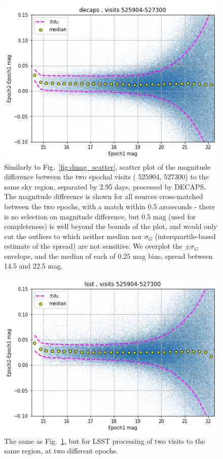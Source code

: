 \documentclass[DM,lsstdraft,toc,usenatbib]{lsstdoc}
\begin{document}
\begin{figure}
\begin{centering}
\includegraphics[width=0.7\columnwidth]{figs/18_decaps-decaps525904-527300_dmag.png}
\caption{Similarly to Fig.~\ref{fig:dmag_scatter}, scatter plot of the magnitude difference between the two epochal visits ( 525904, 527300) to the same sky region, separated by 2.95 days, processed by DECAPS. The magnitude difference is shown for all sources cross-matched between  the two epochs, with a match within 0.5 arcseconds - there is no selection on magnitude difference, but 0.5 mag (used for completeness) is well beyond the bounds of the plot, and would only cut the outliers to which neither median nor $\sigma_{G}$ (interquartile-based estimate of the spread) are not sensitive.  We overplot the $\pm \sigma_{G}$ envelope, and the median of each of 0.25 mag bins, spread between 14.5 and 22.5 mag. }
\label{fig:epoch-epoch_decaps}
\end{centering}
\end{figure} 



\begin{figure}
\begin{centering}
\includegraphics[width=0.7\columnwidth]{figs/19_lsst-lsst525904-527300_dmag.png}
\caption{The same as Fig.~\ref{fig:epoch-epoch_decaps}, but for LSST processing of  two visits to the same region, at two different epochs.  }
\label{fig:epoch-epoch_lsst}
\end{centering}
\end{figure} 
\end{document}

